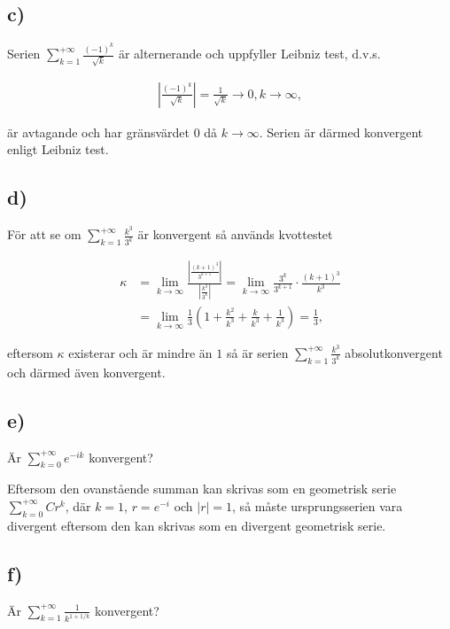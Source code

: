 \documentclass[a4paper]{article}
\begin{document}
\subsection*{c)}

Serien $\sum_{k=1}^{+\infty}\frac{(-1)^k}{\sqrt{k}}$ är alternerande och
uppfyller Leibniz test, d.v.s.

\begin{align*}
  \left| \frac{(-1)^k}{\sqrt{k}} \right| = \frac{1}{\sqrt{k}} \to 0, k \to \infty,
\end{align*}

\noindent är avtagande och har gränsvärdet $0$ då $k\to\infty$. Serien är därmed
konvergent enligt Leibniz test.

\subsection*{d)}

För att se om $\sum_{k=1}^{+\infty}\frac{k^3}{3^k}$ är konvergent så används
kvottestet

\begin{align*}
 \kappa &= \lim_{k\to\infty} \frac{\left| \frac{(k+1)^3}{3^{k+1}} \right|}{\left| \frac{k^3}{3^k} \right|}
          = \lim_{k\to\infty} \frac{3^k}{3^{k+1}}\cdot\frac{(k+1)^3}{k^3}\\
  &= \lim_{k\to\infty} \frac{1}{3}\left( 1 + \frac{k^2}{k^3} + \frac{k}{k^3} + \frac{1}{k^3} \right) = \frac{1}{3},
\end{align*}

\noindent eftersom $\kappa$ existerar och är mindre än $1$ så är serien
$\sum_{k=1}^{+\infty}\frac{k^3}{3^k}$ absolutkonvergent och därmed även konvergent.

\subsection*{e)}

Är $\sum_{k=0}^{+\infty}e^{-ik}$ konvergent?

Eftersom den ovanstående summan kan skrivas som en geometrisk serie
$\sum_{k=0}^{+\infty}Cr^k$, där $k = 1$, $r = e^{-i}$ och $|r| = 1$, så måste
ursprungsserien vara divergent eftersom den kan skrivas som en divergent
geometrisk serie.

\subsection*{f)}

Är $\sum_{k=1}^{+\infty}\frac{1}{k^{1+1/k}}$ konvergent?
\end{document}
